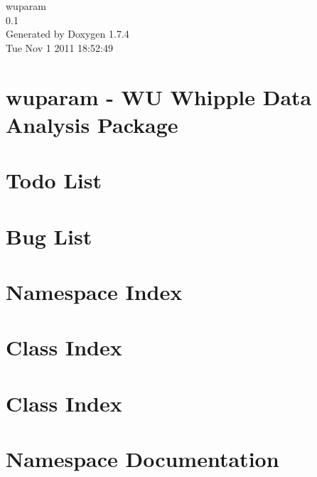 \documentclass[letterpaper]{article}
\begin{document}
\hypersetup{pageanchor=false}
\begin{titlepage}
\vspace*{7cm}
\begin{center}
{\Large wuparam \\[1ex]\large 0.1 }\\
\vspace*{1cm}
{\large Generated by Doxygen 1.7.4}\\
\vspace*{0.5cm}
{\small Tue Nov 1 2011 18:52:49}\\
\end{center}
\end{titlepage}
\tableofcontents
{}
\hypersetup{pageanchor=true}
\section{wuparam -\/ WU Whipple Data Analysis Package}
\label{index}\hypertarget{index}{}
\section{Todo List}
\label{todo}
\hypertarget{todo}{}

\section{Bug List}
\label{bug}
\hypertarget{bug}{}

\section{Namespace Index}

\section{Class Index}

\section{Class Index}

\section{Namespace Documentation}


\end{document}
